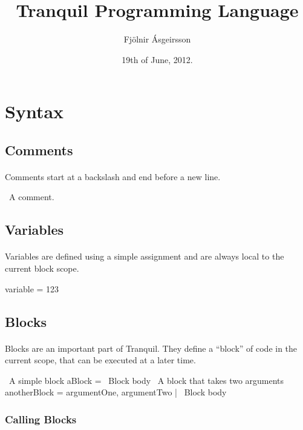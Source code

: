 \documentclass[12pt]{article}
\title{Tranquil Programming Language}
\author{Fjölnir Ásgeirsson}
\date{19th of June, 2012.}
\begin{document}
\maketitle

\section{Syntax}

\subsection{Comments}
\paragraph{}
Comments start at a backslash and end before a new line.
\begin{tranquilcode}
	\ A comment.
\end{tranquilcode}

\subsection{Variables}
\paragraph{}
Variables are defined using a simple assignment and are always local to the current block scope.

\begin{tranquilcode}
	variable = 123
\end{tranquilcode}

\subsection{Blocks}
\paragraph{}
Blocks are an important part of Tranquil. They define a ``block'' of code in the current scope, that can be executed at a later time.

\begin{tranquilcode}
	\ A simple block
	aBlock = {
		\ Block body
	}
	\ A block that takes two arguments
	anotherBlock = { argumentOne, argumentTwo |
		\ Block body
	}
\end{tranquilcode}

\subsubsection{Calling Blocks}
\end{document}
